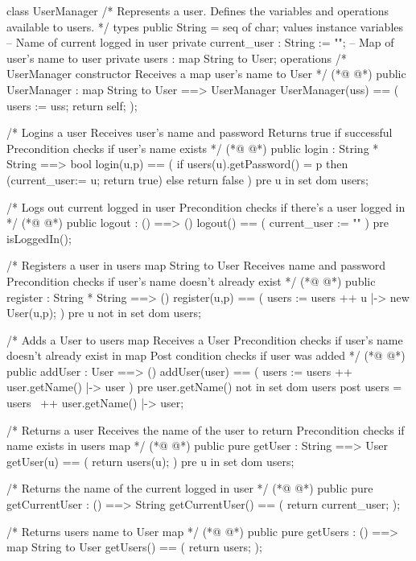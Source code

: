 \begin{vdmpp}[breaklines=true]
class UserManager
/*
  Represents a user.
  Defines the variables and operations available to users.
*/
types
 public String = seq of char;
values
instance variables
 -- Name of current logged in user
  private current_user : String := "";
  -- Map of user's name to user
 private users : map String to User;
operations
 /*
  UserManager constructor
  Receives a map user's name to User
 */
(*@
\label{UserManager:19}
@*)
 public UserManager : map String to User ==> UserManager
 UserManager(uss) == (
  users := uss;
  return self;
 );
 
 /*
  Logins a user
  Receives user's name and password
  Returns true if successful
  Precondition checks if user's name exists
 */
(*@
\label{login:31}
@*)
 public login : String * String ==> bool
 login(u,p) == (
  if users(u).getPassword() = p
  then (current_user:= u; return true)
  else return false
 )
 pre u in set dom users;
 
 /*
  Logs out current logged in user
  Precondition checks if there's a user logged in
 */
(*@
\label{logout:43}
@*)
 public logout : () ==> ()
 logout() == (
  current_user := ""
 )
 pre isLoggedIn();
 
 /*
  Registers a user in users map String to User
  Receives name and password
  Precondition checks if user's name doesn't already exist
 */
(*@
\label{register:54}
@*)
 public register : String * String ==> ()
 register(u,p) == (
  users := users ++ {u |-> new User(u,p)};
 )
 pre u not in set dom users;
 
 /*
  Adds a User to users map
  Receives a User
  Precondition checks if user's name doesn't already exist in map
  Post condition checks if user was added
 */
(*@
\label{addUser:66}
@*)
 public addUser : User ==> ()
 addUser(user) == (
  users := users ++ {user.getName() |-> user}
 )
 pre user.getName() not in set dom users
 post users = users~ ++ {user.getName() |-> user};
 
 /*
  Returns a user
  Receives the name of the user to return
  Precondition checks if name exists in users map
 */
(*@
\label{getUser:78}
@*)
 public pure getUser : String ==> User
 getUser(u) == (
  return users(u);
 )
 pre u in set dom users;

 /*
  Returns the name of the current logged in user
 */
(*@
\label{getCurrentUser:87}
@*)
 public pure getCurrentUser : () ==> String
 getCurrentUser() == (
  return current_user;
 );
 
 /*
  Returns users name to User map
 */
(*@
\label{getUsers:95}
@*)
 public pure getUsers : () ==> map String to User
 getUsers() == (
  return users;
 );
 

\end{vdmpp}
